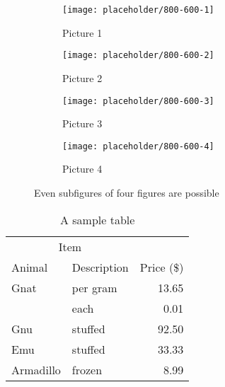 \begin{figure}
    \centering
    \begin{subfigure}[b]{0.49\textwidth}
        \texttt{[image: placeholder/800-600-1]}
        \caption{Picture 1}
        \label{fig:subfigures-four:1}
    \end{subfigure}
    \hfill
    \begin{subfigure}[b]{0.49\textwidth}
        \texttt{[image: placeholder/800-600-2]}
        \caption{Picture 2}
        \label{fig:subfigures-four:2}
    \end{subfigure}
    \hfill
    \begin{subfigure}[b]{0.49\textwidth}
        \texttt{[image: placeholder/800-600-3]}
        \caption{Picture 3}
        \label{fig:subfigures-four:3}
    \end{subfigure}
    \hfill
    \begin{subfigure}[b]{0.49\textwidth}
        \texttt{[image: placeholder/800-600-4]}
        \caption{Picture 4}
        \label{fig:subfigures-four:4}
    \end{subfigure}
    
    \caption{Even subfigures of four figures are possible}
    \label{fig:subfigures-four}
\end{figure}

\begin{table}
    \centering
    \caption{A sample table}
    \label{tbl:sample-table}
    \begin{tabular}{@{}llr@{}} \toprule
        \multicolumn{2}{c}{Item} \\ \cmidrule(r){1-2}
        Animal & Description & Price (\$)\\ \midrule
        Gnat  & per gram  & 13.65 \\
        & each      & 0.01 \\
        Gnu   & stuffed   & 92.50 \\
        Emu   & stuffed   & 33.33 \\
        Armadillo & frozen & 8.99 \\ \bottomrule
    \end{tabular}
\end{table}

